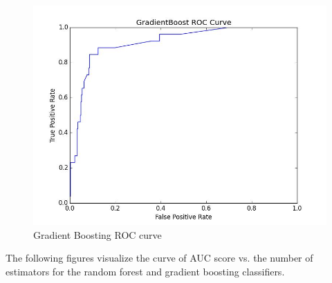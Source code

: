 \documentclass{article} %
\begin{document}
\begin{figure}[h]
\centering
{\caption{Gradient Boosting ROC curve} \includegraphics[scale=0.4]{img/grad_roc.jpg}}
\end{figure}

The following figures visualize the curve of AUC score vs. the number of estimators for the random forest and gradient boosting classifiers.

\begin{figure}[h]
    \centering
    \qquad
\end{figure}
\end{document}
